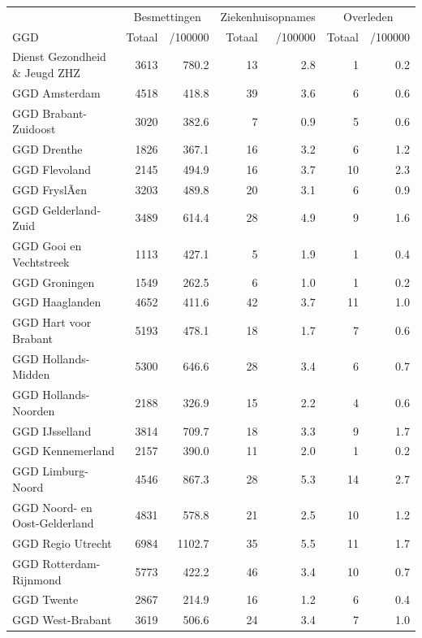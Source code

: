 \documentclass[
  english,
  man,floatsintext]{apa6}
\begin{document}
\begin{table}
\centering\begingroup\fontsize{10}{12}\selectfont

\begin{threeparttable}
\begin{tabular}{lrrrrrr}
\toprule
\multicolumn{1}{c}{ } & \multicolumn{2}{c}{Besmettingen} & \multicolumn{2}{c}{Ziekenhuisopnames} & \multicolumn{2}{c}{Overleden} \\
\cmidrule(l{3pt}r{3pt}){2-3} \cmidrule(l{3pt}r{3pt}){4-5} \cmidrule(l{3pt}r{3pt}){6-7}
GGD & Totaal & /100000 & Totaal & /100000 & Totaal & /100000\\
\midrule
Dienst Gezondheid \& Jeugd ZHZ & 3613 & 780.2 & 13 & 2.8 & 1 & 0.2\\
GGD Amsterdam & 4518 & 418.8 & 39 & 3.6 & 6 & 0.6\\
GGD Brabant-Zuidoost & 3020 & 382.6 & 7 & 0.9 & 5 & 0.6\\
GGD Drenthe & 1826 & 367.1 & 16 & 3.2 & 6 & 1.2\\
GGD Flevoland & 2145 & 494.9 & 16 & 3.7 & 10 & 2.3\\
GGD FryslÃ¢n & 3203 & 489.8 & 20 & 3.1 & 6 & 0.9\\
GGD Gelderland-Zuid & 3489 & 614.4 & 28 & 4.9 & 9 & 1.6\\
GGD Gooi en Vechtstreek & 1113 & 427.1 & 5 & 1.9 & 1 & 0.4\\
GGD Groningen & 1549 & 262.5 & 6 & 1.0 & 1 & 0.2\\
GGD Haaglanden & 4652 & 411.6 & 42 & 3.7 & 11 & 1.0\\
GGD Hart voor Brabant & 5193 & 478.1 & 18 & 1.7 & 7 & 0.6\\
GGD Hollands-Midden & 5300 & 646.6 & 28 & 3.4 & 6 & 0.7\\
GGD Hollands-Noorden & 2188 & 326.9 & 15 & 2.2 & 4 & 0.6\\
GGD IJsselland & 3814 & 709.7 & 18 & 3.3 & 9 & 1.7\\
GGD Kennemerland & 2157 & 390.0 & 11 & 2.0 & 1 & 0.2\\
GGD Limburg-Noord & 4546 & 867.3 & 28 & 5.3 & 14 & 2.7\\
GGD Noord- en Oost-Gelderland & 4831 & 578.8 & 21 & 2.5 & 10 & 1.2\\
GGD Regio Utrecht & 6984 & 1102.7 & 35 & 5.5 & 11 & 1.7\\
GGD Rotterdam-Rijnmond & 5773 & 422.2 & 46 & 3.4 & 10 & 0.7\\
GGD Twente & 2867 & 214.9 & 16 & 1.2 & 6 & 0.4\\
GGD West-Brabant & 3619 & 506.6 & 24 & 3.4 & 7 & 1.0\\

\end{tabular}
\end{threeparttable}
\end{table}
\end{document}
